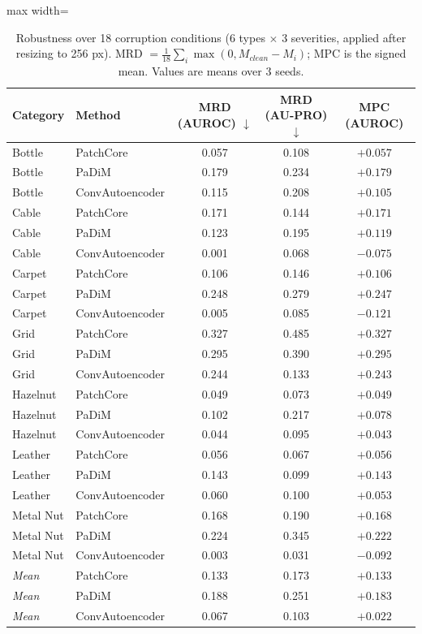 \begin{table}[tbp]
\centering
\small
\caption{Robustness over 18 corruption conditions (6 types $\times$ 3 severities, applied after resizing to 256 px). MRD $=\frac{1}{18}\sum_i\max(0,M_{clean}-M_i)$; MPC is the signed mean. Values are means over 3 seeds.}
\label{tab:robustness}
\begin{adjustbox}{max width=\linewidth}
\begin{tabular}{llccc}
\toprule
\textbf{Category} & \textbf{Method} & \textbf{MRD (AUROC)} $\downarrow$ & \textbf{MRD (AU-PRO)} $\downarrow$ & \textbf{MPC (AUROC)} \\
\midrule
Bottle & PatchCore & 0.057 & 0.108 & $+0.057$ \\
Bottle & PaDiM & 0.179 & 0.234 & $+0.179$ \\
Bottle & ConvAutoencoder & 0.115 & 0.208 & $+0.105$ \\
\midrule
Cable & PatchCore & 0.171 & 0.144 & $+0.171$ \\
Cable & PaDiM & 0.123 & 0.195 & $+0.119$ \\
Cable & ConvAutoencoder & 0.001 & 0.068 & $-0.075$ \\
\midrule
Carpet & PatchCore & 0.106 & 0.146 & $+0.106$ \\
Carpet & PaDiM & 0.248 & 0.279 & $+0.247$ \\
Carpet & ConvAutoencoder & 0.005 & 0.085 & $-0.121$ \\
\midrule
Grid & PatchCore & 0.327 & 0.485 & $+0.327$ \\
Grid & PaDiM & 0.295 & 0.390 & $+0.295$ \\
Grid & ConvAutoencoder & 0.244 & 0.133 & $+0.243$ \\
\midrule
Hazelnut & PatchCore & 0.049 & 0.073 & $+0.049$ \\
Hazelnut & PaDiM & 0.102 & 0.217 & $+0.078$ \\
Hazelnut & ConvAutoencoder & 0.044 & 0.095 & $+0.043$ \\
\midrule
Leather & PatchCore & 0.056 & 0.067 & $+0.056$ \\
Leather & PaDiM & 0.143 & 0.099 & $+0.143$ \\
Leather & ConvAutoencoder & 0.060 & 0.100 & $+0.053$ \\
\midrule
Metal Nut & PatchCore & 0.168 & 0.190 & $+0.168$ \\
Metal Nut & PaDiM & 0.224 & 0.345 & $+0.222$ \\
Metal Nut & ConvAutoencoder & 0.003 & 0.031 & $-0.092$ \\
\midrule
\textit{Mean} & PatchCore & 0.133 & 0.173 & $+0.133$ \\
\textit{Mean} & PaDiM & 0.188 & 0.251 & $+0.183$ \\
\textit{Mean} & ConvAutoencoder & 0.067 & 0.103 & $+0.022$ \\
\bottomrule
\end{tabular}
\end{adjustbox}
\end{table}
